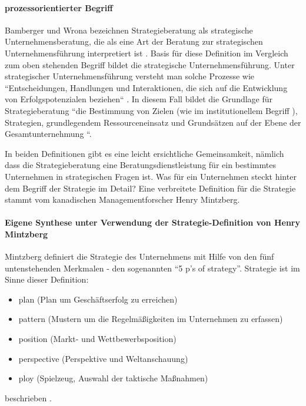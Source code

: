 \paragraph*{prozessorientierter Begriff}

 Bamberger und Wrona bezeichnen Strategieberatung als strategische Unternehmensberatung, die als eine Art der Beratung zur strategischen Unternehmensführung interpretiert ist \cite[4]{BambergerWrona201205}. Basis für diese Definition im Vergleich zum oben stehenden Begriff bildet die strategische Unternehmensführung. Unter strategischer Unternehmensführung versteht man solche Prozesse wie ``Entscheidungen, Handlungen und Interaktionen, die sich auf die Entwicklung von Erfolgspotenzialen beziehen`` \cite[4]{BambergerWrona201205}.
 In diesem Fall bildet die Grundlage für Strategieberatung ``die Bestimmung von Zielen (wie im institutionellem Begriff ), Strategien, grundlegendem Ressourceneinsatz und Grundsätzen auf der Ebene der Gesamtunternehmung ``\cite[4]{BambergerWrona201205}.

In beiden Definitionen gibt es eine leicht ersichtliche  Gemeinsamkeit, nämlich dass die Strategieberatung eine Beratungsdienstleistung für ein bestimmtes Unternehmen in strategischen Fragen ist. 
Was  für ein Unternehmen steckt hinter dem Begriff der Strategie im Detail? Eine verbreitete Definition für die Strategie stammt vom kanadischen Managementforscher Henry Mintzberg.


\paragraph*{Eigene Synthese unter Verwendung der Strategie-Definition von Henry Mintzberg} 
Mintzberg definiert die Strategie des Unternehmens mit Hilfe von den fünf untenstehenden Merkmalen - den sogenannten “5 p’s of strategy”.
Strategie ist im Sinne dieser Definition:
\begin{itemize}

\item plan (Plan um Geschäftserfolg zu erreichen)
\item pattern (Mustern um die Regelmäßigkeiten im Unternehmen zu erfassen)
\item position (Markt- und Wettbewerbsposition)
\item perspective (Perspektive und Weltanschauung)
\item ploy (Spielzeug, Auswahl der taktische Maßnahmen) 
\end{itemize}
beschrieben \cite{5Ps}.

